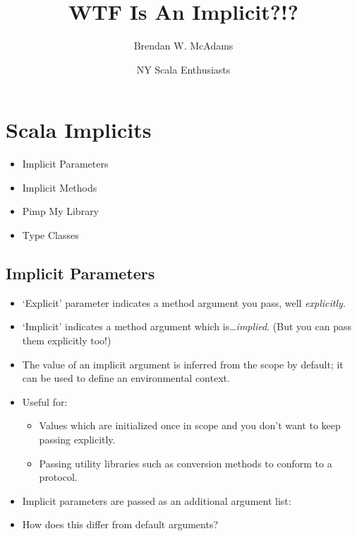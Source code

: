 \documentclass[xcolor=dvipsnames]{beamer}
\title{WTF Is An Implicit?!?} %
\institute[10gen, Inc.]{10gen, Inc.}
\author[B.W. McAdams]{Brendan W. McAdams}
\date{NY Scala Enthusiasts}
\newenvironment{itemizeframe}
               {\begin{frame}\startitemizeframe} 
               {\stopitemizeframe\end{frame}}
\newcommand\startitemizeframe{\begin{itemize}} \newcommand\stopitemizeframe{\end{itemize}}
\begin{document}
\begin{frame}
  \titlepage
\end{frame}

\section{Scala Implicits}

\begin{itemizeframe}
    \frametitle{Types of Implicits}
    \framesubtitle{Major Coverages}
    \item Implicit Parameters
    \item Implicit Methods
    \item Pimp My Library
    \item Type Classes
\end{itemizeframe}

\subsection{Implicit Parameters}
\begin{itemizeframe}
    \frametitle{Implicit Parameters}
    \framesubtitle{What Are Implicit Parameters?}
    \item `Explicit' parameter indicates a method argument you pass, well \emph{explicitly}.
    \item `Implicit' indicates a method argument which is\ldots \emph{implied}. (But you can pass them explicitly too!)
    \item The value of an implicit argument is inferred from the scope by default; it can be used to define an environmental context.
    \item Useful for:
        \begin{itemize}
            \item Values which are initialized once in scope and you don't want to keep passing explicitly.
            \item Passing utility libraries such as conversion methods to conform to a protocol.
        \end{itemize}
\end{itemizeframe}

\begin{itemizeframe}
    \frametitle{Implicit Parameters}
    \framesubtitle{Demonstrated\ldots}
    \item Implicit parameters are passed as an additional argument list:
        
    \pause
    \item How does this differ from default arguments? 
\end{itemizeframe}
\end{document}
